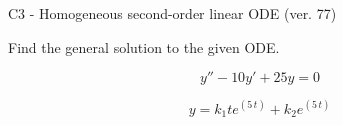 \begin{exercise}
  \begin{exerciseTitle}C3 - Homogeneous second-order linear ODE (ver. 77)\end{exerciseTitle}
  \begin{exerciseStatement}
    
Find the general solution to the given ODE.

    
\[y''-10y'+25y = 0\]

  \end{exerciseStatement}
  \begin{exerciseAnswer}
    
\[y= k_{1} t e^{\left(5 \, t\right)} + k_{2} e^{\left(5 \, t\right)}\]

  \end{exerciseAnswer}
\end{exercise}